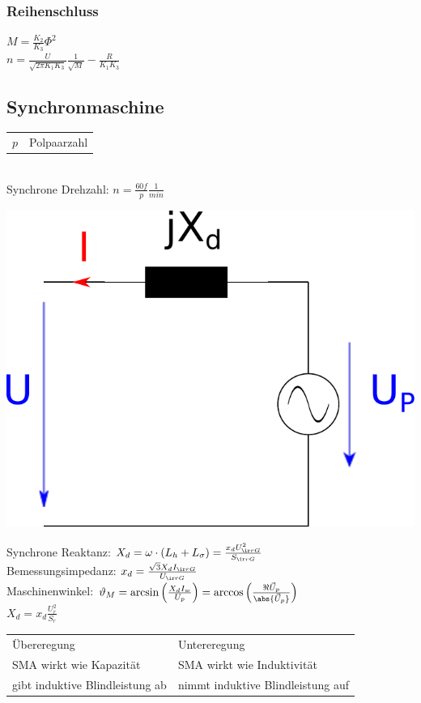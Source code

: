\documentclass[european]{latex4ei_sheet}
\begin{document}
		
		\subsubsection{Reihenschluss}
		$M = \frac{K_2}{K_3} \Phi^2$ \\
		$n = \frac{U}{\sqrt{2 \pi K_1 K_3}} \frac{1}{\sqrt{M}} - \frac{R}{K_1 K_3}$
		
		
		\subsection{Synchronmaschine}
		\begin{tabular}{cl}
		$p$ & Polpaarzahl \\
		\end{tabular}
		\\
		Synchrone Drehzahl: $n = \frac{60f}{p} \si{\frac{1}{min}}$
		
		\begin{center}
		\includegraphics[scale=.2]{./img/ersatzschaltbild_synchronmaschine.pdf}
		\end{center}
		
		Synchrone Reaktanz: $X_d = \omega \cdot (L_h + L_\sigma) = \frac{x_dU_{\ir rG}^2}{S_{\ir rG}}$\\
		Bemessungsimpedanz: $x_d = \frac{\sqrt{3}X_dI_{\ir rG}}{U_{\ir rG}}$\\
		Maschinenwinkel: $\vartheta_M = \arcsin{\left(\frac{X_dI_w}{U_p}\right)} = \arccos{\left(\frac{\Re{\vec U_p}}{\abs{\vec U_p}}\right)}$\\
		$X_d = x_d \frac{U_r^2}{S_r}$ \\
		\begin{tabular}{ll}
			Übereregung & Untereregung\\ \mrule
			SMA wirkt wie Kapazität & SMA wirkt wie Induktivität\\
			gibt induktive Blindleistung ab & nimmt induktive Blindleistung auf\\
		\end{tabular}
				
\end{document}
